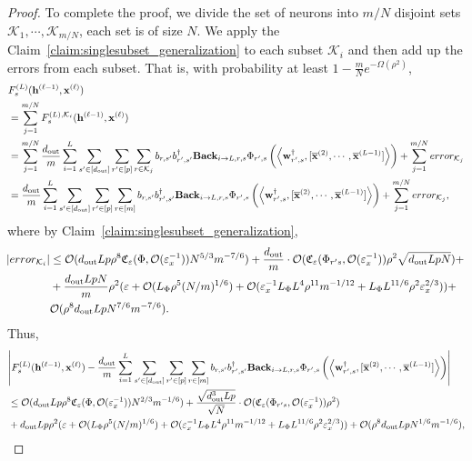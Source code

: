 \begin{proof}
	To complete the proof, we divide the set of neurons into $m/N$ disjoint sets $\mathcal{K}_1, \cdots, \mathcal{K}_{m/N}$, each set is of size $N$. We apply the Claim~\ref{claim:singlesubset_generalization} to each subset $\mathcal{K}_i$ and then add up the errors from each subset. That is, with probability at least $1 - \frac{m}{N}e^{-\Omega(\rho^2)}$,
			\begingroup \allowdisplaybreaks
			\begin{align*}
				&F_s^{(L)}(\mathbf{h}^{(\ell-1)}, \mathbf{x}^{(\ell)}) \\&=  \sum_{j=1}^{m/N}  F_s^{(L),\mathcal{K}_i}(\mathbf{h}^{(\ell-1)}, \mathbf{x}^{(\ell)})\\
				&= \sum_{j=1}^{m/N} \frac{d_{\mathrm{out}} }{m} \sum_{i=1}^{L}  \sum_{s' \in [d_{\mathrm{out}} ]} \sum_{r' \in [p]} \sum_{r \in \mathcal{K}_j}  b_{r, s'} b_{r', s'}^{\dagger} \mathbf{Back}_{i \to L, r, s} \Phi_{r', s} \left(\left\langle \mathbf{w}_{r', s}^{\dagger}, [\overline{\mathbf{x}}^{(2)}, \cdots, \overline{\mathbf{x}}^{(L-1)}]\right\rangle\right) 
				+ \sum_{j=1}^{m/N} error_{\mathcal{K}_j} \\&
				=  \frac{d_{\mathrm{out}} }{m} \sum_{i=1}^{L}  \sum_{s' \in [d_{\mathrm{out}} ]} \sum_{r' \in [p]} \sum_{r \in [m]}  b_{r, s'} b_{r', s'}^{\dagger} \mathbf{Back}_{i \to L, r, s} \Phi_{r', s} \left(\left\langle \mathbf{w}_{r', s}^{\dagger}, [\overline{\mathbf{x}}^{(2)}, \cdots, \overline{\mathbf{x}}^{(L-1)}]\right\rangle\right) 
				+ \sum_{j=1}^{m/N} error_{\mathcal{K}_j}, 
			\end{align*}
			where by Claim~\ref{claim:singlesubset_generalization},
			\begin{align*}
				\abs{error_{\mathcal{K}_i}} &\le \mathcal{O}(d_{\mathrm{out}} Lp\rho^8  \mathfrak{C}_{\varepsilon}(\Phi, \mathcal{O}(\varepsilon_x^{-1})) N^{5/3} m^{-7/6}) + \frac{d_{\mathrm{out}} }{m} \cdot \mathcal{O}(\mathfrak{C}_{\varepsilon}(\Phi_{r' s}, \mathcal{O}(\varepsilon_x^{-1})) \rho^2 \sqrt{d_{\mathrm{out}} LpN}) + \\& + \frac{d_{\mathrm{out}} LpN}{m} \rho^2 (\varepsilon + \mathcal{O}( L_{\Phi}\rho^5 (N/m)^{1/6}) + \mathcal{O}(\varepsilon_x^{-1} L_{\Phi} L^4 \rho^{11} m^{-1/12} +  L_{\Phi} L^{11/6} \rho^2 \varepsilon_x^{2/3})) + \\& \mathcal{O}(\rho^8d_{\mathrm{out}} Lp N^{7/6} m^{-7/6}).
			\end{align*}
			\endgroup
			Thus,
			\begin{align*}
				&\abs{ F_s^{(L)}(\mathbf{h}^{(\ell-1)}, \mathbf{x}^{(\ell)}) - \frac{\dout }{m} \sum_{i=1}^{L}  \sum_{s' \in [\dout ]} \sum_{r' \in [p]} \sum_{r \in [m]}  b_{r, s'} b_{r', s'}^{\dagger} \mathbf{Back}_{i \to L, r, s} \Phi_{r', s} \left(\left\langle \mathbf{w}_{r', s}^{\dagger}, [\overline{\mathbf{x}}^{(2)}, \cdots, \overline{\mathbf{x}}^{(L-1)}]\right\rangle\right) } \\& \le \mathcal{O}(\dout Lp\rho^8  \mathfrak{C}_{\varepsilon}(\Phi, \mathcal{O}(\varepsilon_x^{-1})) N^{2/3} m^{-1/6}) + \frac{\sqrt{\dout ^3Lp}}{\sqrt{N}} \cdot \mathcal{O}(\mathfrak{C}_{\varepsilon}(\Phi_{r' s}, \mathcal{O}(\varepsilon_x^{-1})) \rho^2 )  \\& + \dout Lp \rho^2 (\varepsilon + \mathcal{O}( L_{\Phi}\rho^5 (N/m)^{1/6}) + \mathcal{O}(\varepsilon_x^{-1} L_{\Phi} L^4 \rho^{11} m^{-1/12} +  L_{\Phi} L^{11/6} \rho^2 \varepsilon_x^{2/3})) + \mathcal{O}(\rho^8\dout Lp N^{1/6} m^{-1/6}),

\end{align*}
\end{proof}
